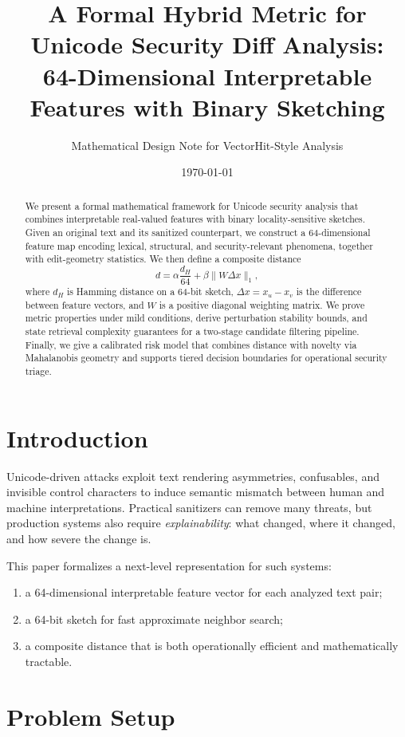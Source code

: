\documentclass[11pt,a4paper]{article}
\title{A Formal Hybrid Metric for Unicode Security Diff Analysis:\\
64-Dimensional Interpretable Features with Binary Sketching}
\author{Mathematical Design Note for VectorHit-Style Analysis}
\date{\today}
\begin{document}
\maketitle

\begin{abstract}
We present a formal mathematical framework for Unicode security analysis that combines interpretable real-valued features with binary locality-sensitive sketches. Given an original text and its sanitized counterpart, we construct a 64-dimensional feature map encoding lexical, structural, and security-relevant phenomena, together with edit-geometry statistics. We then define a composite distance
\[
d = \alpha \frac{d_H}{64} + \beta \lVert W\Delta x \rVert_1,
\]
where $d_H$ is Hamming distance on a 64-bit sketch, $\Delta x = x_u - x_v$ is the difference between feature vectors, and $W$ is a positive diagonal weighting matrix. We prove metric properties under mild conditions, derive perturbation stability bounds, and state retrieval complexity guarantees for a two-stage candidate filtering pipeline. Finally, we give a calibrated risk model that combines distance with novelty via Mahalanobis geometry and supports tiered decision boundaries for operational security triage.
\end{abstract}

\section{Introduction}
Unicode-driven attacks exploit text rendering asymmetries, confusables, and invisible control characters to induce semantic mismatch between human and machine interpretations. Practical sanitizers can remove many threats, but production systems also require \emph{explainability}: what changed, where it changed, and how severe the change is.

This paper formalizes a next-level representation for such systems:
\begin{enumerate}
    \item a 64-dimensional interpretable feature vector for each analyzed text pair;
    \item a 64-bit sketch for fast approximate neighbor search;
    \item a composite distance that is both operationally efficient and mathematically tractable.
\end{enumerate}

\section{Problem Setup}
\end{document}
